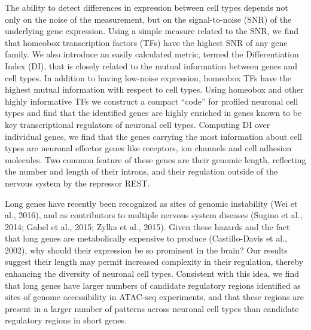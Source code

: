 The ability to detect differences in expression between cell types depends not only on the noise of the measurement, but on the signal-to-noise (SNR) of the underlying gene expression. Using a simple measure related to the SNR, we find that homeobox transcription factors (TFs) have the highest SNR of any gene family. We also introduce an easily calculated metric, termed the Differentiation Index (DI), that is closely related to the mutual information between genes and cell types. In addition to having low-noise expression, homeobox TFs have the highest mutual information with respect to cell types. Using homeobox and other highly informative TFs we construct a compact “code” for profiled neuronal cell types and find that the identified genes are highly enriched in genes known to be key transcriptional regulators of neuronal cell types.
Computing DI over individual genes, we find that the genes carrying the most information about cell types are neuronal effector genes like receptors, ion channels and cell adhesion molecules. Two common feature of these genes are their genomic length, reflecting the number and length of their introns, and their regulation outside of the nervous system by the repressor REST.

Long genes have recently been recognized as sites of genomic instability (Wei et al., 2016), and as contributors to multiple nervous system diseases (Sugino et al., 2014; Gabel et al., 2015; Zylka et al., 2015). Given these hazards and the fact that long genes are metabolically expensive to produce (Castillo-Davis et al., 2002), why should their expression be so prominent in the brain? Our results suggest their length may permit increased complexity in their regulation, thereby enhancing the diversity of neuronal cell types. Consistent with this idea, we find that long genes have larger numbers of candidate regulatory regions identified as sites of genome accessibility in ATAC-seq experiments, and that these regions are present in a larger number of patterns across neuronal cell types than candidate regulatory regions in short genes.
